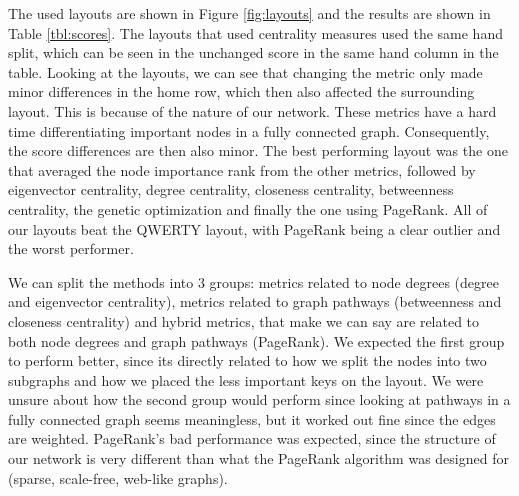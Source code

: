 \documentclass[9pt,twocolumn,twoside]{pnas-report}
\begin{document}
The used layouts are shown in Figure \ref{fig:layouts} and the results are shown in Table \ref{tbl:scores}.
The layouts that used centrality measures used the same hand split, which can be seen in the unchanged score in the same hand column in the table.
Looking at the layouts, we can see that changing the metric only made minor differences in the home row, which then also affected the surrounding layout.
This is because of the nature of our network.
These metrics have a hard time differentiating important nodes in a fully connected graph.
Consequently, the score differences are then also minor.
The best performing layout was the one that averaged the node importance rank from the other metrics, followed by eigenvector centrality, degree centrality, closeness centrality, betweenness centrality, the genetic optimization and finally the one using PageRank.
All of our layouts beat the QWERTY layout, with PageRank being a clear outlier and the worst performer.

We can split the methods into 3 groups: metrics related to node degrees (degree and eigenvector centrality), metrics related to graph pathways (betweenness and closeness centrality) and hybrid metrics, that make we can say are related to both node degrees and graph pathways (PageRank).
We expected the first group to perform better, since its directly related to how we split the nodes into two subgraphs and how we placed the less important keys on the layout.
We were unsure about how the second group would perform since looking at pathways in a fully connected graph seems meaningless, but it worked out fine since the edges are weighted.
PageRank's bad performance was expected, since the structure of our network is very different than what the PageRank algorithm was designed for (sparse, scale-free, web-like graphs).
\end{document}
